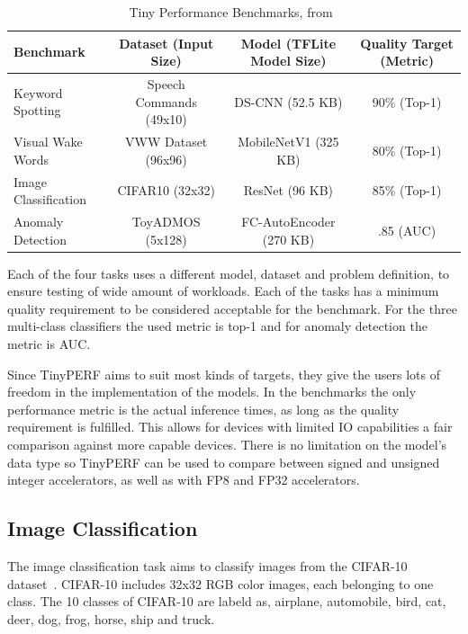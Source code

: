 \documentclass[12pt,a4paper,english
]{tunithesis}
\begin{document}
\begin{table}[ht]
\centering
\caption{Tiny Performance Benchmarks, from~\parencite{tinyperf}}
\begin{adjustbox}{max width=\textwidth}
\begin{tabular}{lccc}
    \toprule
    \textbf{Benchmark} & \textbf{Dataset (Input Size)} & \textbf{Model (TFLite Model Size)} & \textbf{Quality Target (Metric)} \\
    \midrule
    Keyword Spotting & Speech Commands (49x10) & DS-CNN (52.5 KB) & 90\% (Top-1) \\
    Visual Wake Words & VWW Dataset (96x96)  & MobileNetV1 (325 KB) & 80\% (Top-1) \\
    Image Classification & CIFAR10 (32x32) & ResNet (96 KB) & 85\% (Top-1) \\
    Anomaly Detection & ToyADMOS (5x128)  & FC-AutoEncoder (270 KB) & .85 (AUC) \\
    \bottomrule
\end{tabular}
\end{adjustbox}
\label{tab:tinyperf}
\end{table}
Each of the four tasks uses a different model, dataset and problem definition, to ensure testing of wide amount of workloads. Each of the tasks has a minimum quality requirement to be considered acceptable for the benchmark. For the three multi-class classifiers the used metric is top-1 and for anomaly detection the metric is AUC.

Since TinyPERF aims to suit most kinds of targets, they give the users lots of freedom in the implementation of the models. In the benchmarks the only performance metric is the actual inference times, as long as the quality requirement is fulfilled. This allows for devices with limited IO capabilities a fair comparison against more capable devices. There is no limitation on the model's data type so TinyPERF can be used to compare between signed and unsigned integer accelerators, as well as with FP8 and FP32 accelerators.

\subsection{Image Classification}
The image classification task aims to classify images from the CIFAR-10 dataset~\cite{Cifar10Krizhevsky09learningmultiple}. CIFAR-10 includes 32x32 RGB color images, each belonging to one class. The 10 classes of CIFAR-10 are labeld as, airplane, automobile, bird, cat, deer, dog, frog, horse, ship and truck.
\end{document}
